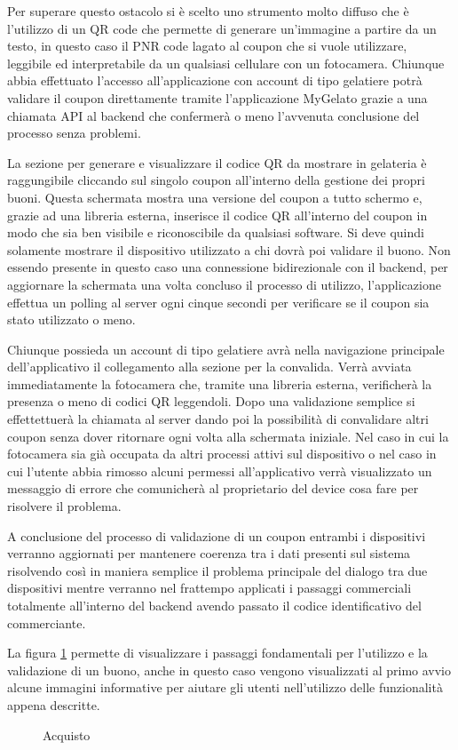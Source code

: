 Per superare questo ostacolo si è scelto uno strumento molto diffuso
che è l'utilizzo di un QR code che permette di generare un'immagine
a partire da un testo, in questo caso il PNR code lagato al coupon
che si vuole utilizzare, leggibile ed interpretabile da un qualsiasi
cellulare con un fotocamera. Chiunque abbia effettuato l'accesso all'applicazione
con account di tipo gelatiere potrà validare il coupon direttamente
tramite l'applicazione MyGelato grazie a una chiamata API al backend
che confermerà o meno l'avvenuta conclusione del processo senza problemi.

La sezione per generare e visualizzare il codice QR da mostrare in
gelateria è raggungibile cliccando sul singolo coupon all'interno
della gestione dei propri buoni. Questa schermata mostra una versione
del coupon a tutto schermo e, grazie ad una libreria esterna, inserisce
il codice QR all'interno del coupon in modo che sia ben visibile e
riconoscibile da qualsiasi software. Si deve quindi solamente mostrare
il dispositivo utilizzato a chi dovrà poi validare il buono. Non essendo
presente in questo caso una connessione bidirezionale con il backend,
per aggiornare la schermata una volta concluso il processo di utilizzo,
l'applicazione effettua un polling al server ogni cinque secondi per
verificare se il coupon sia stato utilizzato o meno.

Chiunque possieda un account di tipo gelatiere avrà nella navigazione
principale dell'applicativo il collegamento alla sezione per la convalida.
Verrà avviata immediatamente la fotocamera che, tramite una libreria
esterna, verificherà la presenza o meno di codici QR leggendoli. Dopo
una validazione semplice si effettettuerà la chiamata al server dando
poi la possibilità di convalidare altri coupon senza dover ritornare
ogni volta alla schermata iniziale. Nel caso in cui la fotocamera
sia già occupata da altri processi attivi sul dispositivo o nel caso
in cui l'utente abbia rimosso alcuni permessi all'applicativo verrà
visualizzato un messaggio di errore che comunicherà al proprietario
del device cosa fare per risolvere il problema.

A conclusione del processo di validazione di un coupon entrambi i
dispositivi verranno aggiornati per mantenere coerenza tra i dati
presenti sul sistema risolvendo così in maniera semplice il problema
principale del dialogo tra due dispositivi mentre verranno nel frattempo
applicati i passaggi commerciali totalmente all'interno del backend
avendo passato il codice identificativo del commerciante. 

La figura \ref{fig:Acquisto} permette di visualizzare i passaggi
fondamentali per l'utilizzo e la validazione di un buono, anche in
questo caso vengono visualizzati al primo avvio alcune immagini informative
per aiutare gli utenti nell'utilizzo delle funzionalità appena descritte.

\begin{figure}

\caption{\label{fig:Acquisto}Acquisto}

\end{figure}

\newpage{}
